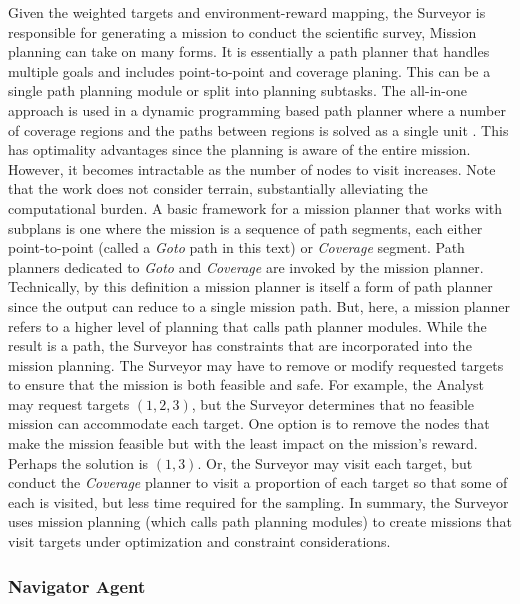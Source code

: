 \documentclass{tamuccthesis}
\begin{document}
Given the weighted targets and environment-reward mapping, the Surveyor is responsible for generating a mission to conduct the scientific survey, Mission planning can take on many forms. It is essentially a path planner that handles multiple goals and includes point-to-point and coverage planing. This can be a single path planning module or split into planning subtasks. The all-in-one approach is used in a dynamic programming based path planner where a number of coverage regions and the paths between regions is solved as a single unit \cite{garcia:planner}. This has optimality advantages since the planning is aware of the entire mission. However, it becomes intractable as the number of nodes to visit increases. Note that the work does not consider terrain, substantially alleviating the computational burden. A basic framework for a mission planner that works with subplans is one where the mission is a sequence of path segments, each either point-to-point (called a \textit{Goto} path in this text) or \textit{Coverage} segment. Path planners dedicated to \textit{Goto} and \textit{Coverage} are invoked by the mission planner. Technically, by this definition a mission planner is itself a form of path planner since the output can reduce to a single mission path. But, here, a mission planner refers to a higher level of planning that calls path planner modules. While the result is a path, the Surveyor has constraints that are incorporated into the mission planning. The Surveyor may have to remove or modify requested targets to ensure that the mission is both feasible and safe. For example, the Analyst may request targets $(1, 2, 3)$, but the Surveyor determines that no feasible mission can accommodate each target. One option is to remove the nodes that make the mission feasible but with the least impact on the mission's reward. Perhaps the solution is $(1, 3)$. Or, the Surveyor may visit each target, but conduct the \textit{Coverage} planner to visit a proportion of each target so that some of each is visited, but less time required for the sampling. In summary, the Surveyor uses mission planning (which calls path planning modules) to create missions that visit targets under optimization and constraint considerations. 

\subsubsection{Navigator Agent}
\end{document}
